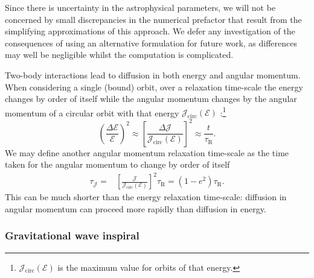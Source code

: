 \documentclass[useAMS,usedcolumn,usegraphicx,usenatbib]{mn2e}
\newcommand{\sub}[1]{\ensuremath{_\mathrm{#1}}}
\begin{document}
Since there is uncertainty in the astrophysical parameters, we will not be concerned by small discrepancies in the numerical prefactor that result from the simplifying approximations of this approach. We defer any investigation of the consequences of using an alternative formulation for future work, as differences may well be negligible whilst the computation is complicated.

Two-body interactions lead to diffusion in both energy and angular momentum. When considering a single (bound) orbit, over a relaxation time-scale the energy changes by order of itself while the angular momentum changes by the angular momentum of a circular orbit with that energy $\mathcal{J}\sub{circ}(\mathcal{E})$ \citep{Lightman1977, Rauch1996, Hopman2005, Madigan2011}:\footnote{$\mathcal{J}\sub{circ}(\mathcal{E})$ is the maximum value for orbits of that energy.}
\begin{equation}
\left(\frac{\Delta\mathcal{E}}{\mathcal{E}}\right)^{2} \approx \left[\frac{\Delta \mathcal{J}}{\mathcal{J}\sub{circ}(\mathcal{E})}\right]^{2} \approx \frac{t}{\tau\sub{R}}.
\label{eq:diffuse-relax}
\end{equation}
We may define another angular momentum relaxation time-scale as the time taken for the angular momentum to change by order of itself \citep{Merritt2011}
\begin{align}
\tau_\mathcal{J} = {} & \left[\frac{\mathcal{J}}{\mathcal{J}\sub{circ}(\mathcal{E})}\right]^2\tau\sub{R} = \left(1 - e^2\right) \tau\sub{R}.
\label{eq:J-time}
\end{align}
This can be much shorter than the energy relaxation time-scale: diffusion in angular momentum can proceed more rapidly than diffusion in energy.

\subsubsection{Gravitational wave inspiral}\label{sec:GW-in}
\end{document}
